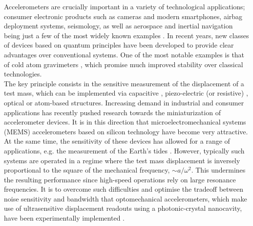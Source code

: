\documentclass[aps,twocolumn,preprintnumbers,amsmath,amssymb]{revtex4}
\begin{document}
Accelerometers are crucially important in a variety of technological applications; consumer electronic products such as cameras and modern smartphones, airbag deployment systems, seismology, as well as aerospace and inertial navigation being just a few of the most widely known examples \cite{krishnan2007}. In recent years, new classes of devices based on quantum principles have been developed to provide clear advantages over conventional systems. One of the most notable examples is that of cold atom gravimeters \cite{muller2008, bidel2013, abend2016}, which promise much improved stability over classical technologies.\\
The key principle consists in the sensitive measurement of the displacement of a test mass, which can be implemented via capacitive \cite{acar2003}, piezo-electric (or resistive) \cite{tadigadapa2009}, optical \cite{krishnamoorthy2008} or atom-based \cite{abend2016} structures. Increasing demand in industrial and consumer applications has recently pushed research towards the miniaturization of accelerometer devices. It is in this direction that microelectromechanical systems (MEMS) accelerometers based on silicon technology have become very attractive. At the same time, the sensitivity of these devices has allowed for a range of applications, e.g. the measurement of the Earth's tides \cite{middlemiss2016}. However, typically such systems are operated in a regime where the test mass displacement is inversely proportional to the square of the mechanical frequency, $\sim a/\omega^2$. This undermines the resulting performance since high-speed operations rely on large resonance frequencies. It is to overcome such difficulties and optimise the tradeoff between noise sensitivity and bandwidth that optomechanical accelerometers, which make use of ultrasensitive displacement readouts using a photonic-crystal nanocavity, have been experimentally implemented \cite{krause2012}.
\end{document}
